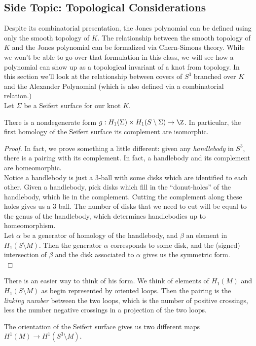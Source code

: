 \subsection{Side Topic: Topological Considerations}
Despite its combinatorial presentation, the Jones polynomial can be defined using only the smooth topology of $K$. The relationship between the smooth topology of $K$ and the Jones polynomial can be formalized via Chern-Simons theory. While we won't be able to go over that formulation in this class, we will see how  a polynomial can show up as a topological invariant of a knot from topology. In this section we'll look at the relationship between covers of $S^3$ branched over $K$ and the Alexander Polynomial (which is also defined via a combinatorial relation.)  \\
Let $\Sigma$ be a Seifert surface for our knot $K$.
\begin{claim}
There is a nondegenerate form $g:H_1(\Sigma)\times H_1(S\setminus \Sigma)\to \Z$. In particular, the first homology of the Seifert surface its complement are isomorphic. 
\end{claim}
\begin{proof}
In fact, we prove something a little different: given any \emph{handlebody} in $S^3$, there is a pairing with its complement. In fact, a handlebody and its complement are homeomorphic. \\
Notice a handlebody is just a 3-ball with some disks which are identified to each other. Given a handlebody, pick disks which fill in the ``donut-holes'' of the handlebody, which lie in the complement. Cutting the complement along these holes gives us a 3 ball. The number of disks that we need to cut will be equal to the genus of the handlebody, which determines handlebodies up to homeomorphism. \\
Let $\alpha$ be a generator of homology of the handlebody, and $\beta$ an element in $H_1(S\setminus M)$. Then the generator $\alpha$ corresponds to some disk, and the (signed) intersection of $\beta$ and the disk associated to $\alpha$ gives us the symmetric  form. \\
\end{proof}
There is an easier way to think of his form. We think of elements of $H_1(M)$ and $H_1(S\setminus M)$ as begin represented by oriented loops. Then the pairing is the \emph{linking number} between the two loops, which is the number of positive crossings, less the number negative crossings in a projection of the two loops. 
\begin{claim}
The orientation of the Seifert surface gives us two different maps $H^1(M)\to H^1(S^3\setminus M)$. \\
\end{claim}
